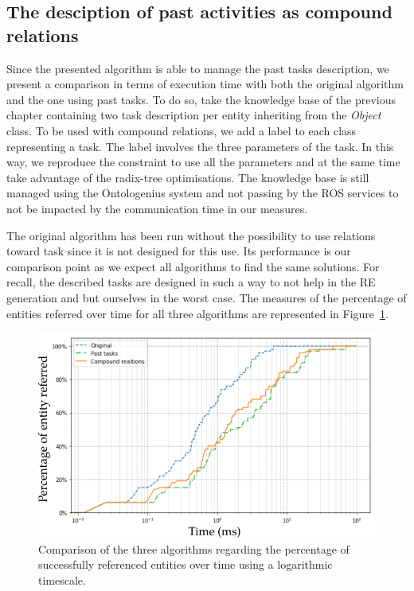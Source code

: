 \subsection{The desciption of past activities as compound relations}

Since the presented algorithm is able to manage the past tasks description, we present a comparison in terms of execution time with both the original algorithm and the one using past tasks. To do so, take the knowledge base of the previous chapter containing two task description per entity inheriting from the \textit{Object} class. To be used with compound relations, we add a label to each class representing a task. The label involves the three parameters of the task. In this way, we reproduce the constraint to use all the parameters and at the same time take advantage of the radix-tree optimisations. The knowledge base is still managed using the Ontologenius system and not passing by the ROS services to not be impacted by the communication time in our measures.

The original algorithm has been run without the possibility to use relations toward task since it is not designed for this use. Its performance is our comparison point as we expect all algorithms to find the same solutions. For recall, the described tasks are designed in such a way to not help in the RE generation and but ourselves in the worst case. The measures of the percentage of entities referred over time for all three algorithms are represented in Figure~\ref{fig:chap7_compare}.

\begin{figure}[h!]
\centering
\includegraphics[scale=0.5]{figures/chapter7/comparison.png}
\caption{\label{fig:chap7_compare} Comparison of the three algorithms regarding the percentage of successfully referenced entities over time using a logarithmic timescale. }
\end{figure}

